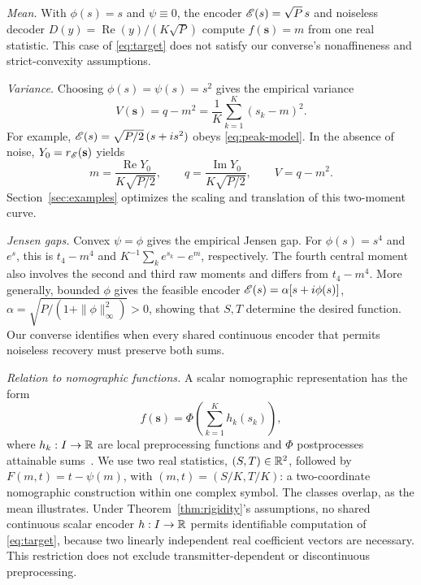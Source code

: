 \emph{Mean.} With $\phi(s)=s$ and $\psi\equiv0$, the encoder $\mathscr E(s)=\sqrt P\,s$ and noiseless decoder $D(y)=\operatorname{Re}(y)/(K\sqrt P)$ compute $f(\mathbf s)=m$ from one real statistic. This case of \eqref{eq:target} does not satisfy our converse's nonaffineness and strict-convexity assumptions.

\emph{Variance.} Choosing $\phi(s)=\psi(s)=s^2$ gives the empirical variance
$$
 V(\mathbf s)=q-m^2=\frac1K\sum_{k=1}^K(s_k-m)^2.
$$
For example, $\mathscr E(s)=\sqrt{P/2}\,(s+i s^2)$ obeys \eqref{eq:peak-model}. In the absence of noise, $Y_0=r_\mathscr E(\mathbf s)$ yields
$$
 m=\frac{\operatorname{Re}Y_0}{K\sqrt{P/2}},\qquad
 q=\frac{\operatorname{Im}Y_0}{K\sqrt{P/2}},\qquad V=q-m^2.
$$
Section~\ref{sec:examples} optimizes the scaling and translation of this two-moment curve.

\emph{Jensen gaps.} Convex $\psi=\phi$ gives the empirical Jensen gap. For $\phi(s)=s^4$ and $e^s$, this is $t_4-m^4$ and $K^{-1}\sum_k e^{s_k}-e^m$, respectively. The fourth central moment also involves the second and third raw moments and differs from $t_4-m^4$. More generally, bounded $\phi$ gives the feasible encoder $\mathscr E(s)=\alpha[s+i\phi(s)]$, $\alpha=\sqrt{P/(1+\|\phi\|_\infty^2)}>0$, showing that $S,T$ determine the desired function. Our converse identifies when every shared continuous encoder that permits noiseless recovery must preserve both sums.

\emph{Relation to nomographic functions.} A scalar nomographic representation has the form
$$
 f(\mathbf s)=\Phi\!\left(\sum_{k=1}^K h_k(s_k)\right),
$$
where $h_k:I\to\mathbb R$ are local preprocessing functions and $\Phi$ postprocesses attainable sums~\cite{goldenbaum2015}. We use two real statistics, $(S,T)\in\mathbb R^2$, followed by $F(m,t)=t-\psi(m)$, with $(m,t)=(S/K,T/K)$: a two-coordinate nomographic construction within one complex symbol. The classes overlap, as the mean illustrates. Under Theorem~\ref{thm:rigidity}'s assumptions, no shared continuous scalar encoder $h:I\to\mathbb R$ permits identifiable computation of \eqref{eq:target}, because two linearly independent real coefficient vectors are necessary. This restriction does not exclude transmitter-dependent or discontinuous preprocessing.

